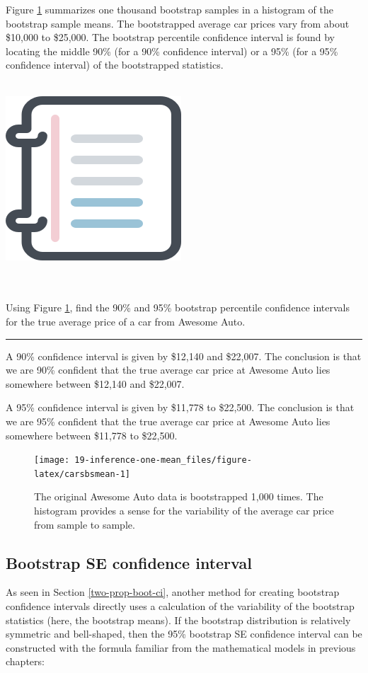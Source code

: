 \documentclass[
  10pt,
  openany]{book}
\newenvironment{mdframedwithfootGPWE}
{   
    \savenotes
    \begin{mdframed}[%
    topline=true, bottomline=true, linecolor=oiB, linewidth=0.5pt,
    rightline=false, leftline=false,
    backgroundcolor=oiLGray]
    \renewcommand{\thempfootnote}{\arabic{footnote}}
    }
{
    \end{mdframed}
    \spewnotes
}
\newenvironment{workedexample}{
    \let\oldrule\rule
    \renewcommand{\rule}[2]{\vspace{-2mm}\oldrule{##1}{##2}\vspace{-2mm}}
\vspace{4mm}
\begin{mdframedwithfootGPWE}
\begin{minipage}[t]{0.10\textwidth}
{$\:$ \\ \setkeys{Gin}{width=2.5em,keepaspectratio}\includegraphics{images/_icons/worked-example.png}}
\end{minipage}
\hfill
\begin{minipage}[t]{0.90\textwidth}
\vspace{-2mm}
\setlength{\parskip}{1em}
\noindent\textbf{\color{oiB}\small\fontfamily{phv}\selectfont{\MakeUppercase{Example}}} $\:$ \\ \\
}{\end{minipage}
\end{mdframedwithfootGPWE}
\vspace{4mm}
}
\begin{document}
Figure \ref{fig:carsbsmean} summarizes one thousand bootstrap samples in a histogram of the bootstrap sample means.
The bootstrapped average car prices vary from about \$10,000 to \$25,000.
The bootstrap percentile confidence interval is found by locating the middle 90\% (for a 90\% confidence interval) or a 95\% (for a 95\% confidence interval) of the bootstrapped statistics.

\begin{workedexample}
Using Figure \ref{fig:carsbsmean}, find the 90\% and 95\% bootstrap percentile confidence intervals for the true average price of a car from Awesome Auto.

\begin{center}\rule{0.5\linewidth}{0.5pt}\end{center}

A 90\% confidence interval is given by \$12,140 and \$22,007.
The conclusion is that we are 90\% confident that the true average car price at Awesome Auto lies somewhere between \$12,140 and \$22,007.

A 95\% confidence interval is given by \$11,778 to \$22,500.
The conclusion is that we are 95\% confident that the true average car price at Awesome Auto lies somewhere between \$11,778 to \$22,500.

\end{workedexample}

\begin{figure}[h]

{\centering \texttt{[image: 19-inference-one-mean\_files/figure-latex/carsbsmean-1]} 

}

\caption{The original Awesome Auto data is bootstrapped 1,000 times. The histogram provides a sense for the variability of the average car price from sample to sample.}\label{fig:carsbsmean}
\end{figure}

\hypertarget{bootstrap-se-confidence-interval}{%
\subsection{Bootstrap SE confidence interval}\label{bootstrap-se-confidence-interval}}

As seen in Section \ref{two-prop-boot-ci}, another method for creating bootstrap confidence intervals directly uses a calculation of the variability of the bootstrap statistics (here, the bootstrap means).
If the bootstrap distribution is relatively symmetric and bell-shaped, then the 95\% bootstrap SE confidence interval can be constructed with the formula familiar from the mathematical models in previous chapters:
\end{document}
